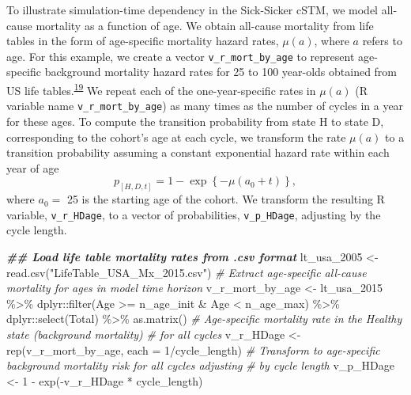 \documentclass[
]{article}
\newenvironment{Shaded}{\begin{snugshade}}{\end{snugshade}}
\newcommand{\AttributeTok}[1]{\textcolor[rgb]{0.77,0.63,0.00}{#1}}
\newcommand{\CommentTok}[1]{\textcolor[rgb]{0.56,0.35,0.01}{\textit{#1}}}
\newcommand{\DecValTok}[1]{\textcolor[rgb]{0.00,0.00,0.81}{#1}}
\newcommand{\DocumentationTok}[1]{\textcolor[rgb]{0.56,0.35,0.01}{\textbf{\textit{#1}}}}
\newcommand{\FunctionTok}[1]{\textcolor[rgb]{0.00,0.00,0.00}{#1}}
\newcommand{\NormalTok}[1]{#1}
\newcommand{\OtherTok}[1]{\textcolor[rgb]{0.56,0.35,0.01}{#1}}
\newcommand{\SpecialCharTok}[1]{\textcolor[rgb]{0.00,0.00,0.00}{#1}}
\newcommand{\StringTok}[1]{\textcolor[rgb]{0.31,0.60,0.02}{#1}}
\begin{document}
To illustrate simulation-time dependency in the Sick-Sicker cSTM, we model all-cause mortality as a function of age. We obtain all-cause mortality from life tables in the form of age-specific mortality hazard rates, \(\mu(a)\), where \(a\) refers to age. For this example, we create a vector \texttt{v\_r\_mort\_by\_age} to represent age-specific background mortality hazard rates for 25 to 100 year-olds obtained from US life tables.\textsuperscript{\protect\hyperlink{ref-Arias2017}{19}} We repeat each of the one-year-specific rates in \(\mu(a)\) (R variable name \texttt{v\_r\_mort\_by\_age}) as many times as the number of cycles in a year for these ages. To compute the transition probability from state H to state D, corresponding to the cohort's age at each cycle, we transform the rate \(\mu(a)\) to a transition probability assuming a constant exponential hazard rate within each year of age
\[
  p_{[H,D,t]} = 1-\exp\left\{{-\mu(a_0 + t)}\right\},
\]
where \(a_0 =\) 25 is the starting age of the cohort. We transform the resulting R variable, \texttt{v\_r\_HDage}, to a vector of probabilities, \texttt{v\_p\_HDage}, adjusting by the cycle length.

\begin{Shaded}
\begin{Highlighting}[]
\DocumentationTok{\#\# Load life table mortality rates from \textasciigrave{}.csv\textasciigrave{} format}
\NormalTok{lt\_usa\_2005 }\OtherTok{\textless{}{-}} \FunctionTok{read.csv}\NormalTok{(}\StringTok{"LifeTable\_USA\_Mx\_2015.csv"}\NormalTok{)}
\CommentTok{\# Extract age{-}specific all{-}cause mortality for ages in model time horizon}
\NormalTok{v\_r\_mort\_by\_age }\OtherTok{\textless{}{-}}\NormalTok{ lt\_usa\_2015 }\SpecialCharTok{\%\textgreater{}\%} 
\NormalTok{  dplyr}\SpecialCharTok{::}\FunctionTok{filter}\NormalTok{(Age }\SpecialCharTok{\textgreater{}=}\NormalTok{ n\_age\_init }\SpecialCharTok{\&}\NormalTok{ Age }\SpecialCharTok{\textless{}}\NormalTok{ n\_age\_max) }\SpecialCharTok{\%\textgreater{}\%}
\NormalTok{  dplyr}\SpecialCharTok{::}\FunctionTok{select}\NormalTok{(Total) }\SpecialCharTok{\%\textgreater{}\%}
  \FunctionTok{as.matrix}\NormalTok{()}
\CommentTok{\# Age{-}specific mortality rate in the Healthy state (background mortality) }
\CommentTok{\# for all cycles}
\NormalTok{v\_r\_HDage  }\OtherTok{\textless{}{-}} \FunctionTok{rep}\NormalTok{(v\_r\_mort\_by\_age, }\AttributeTok{each =} \DecValTok{1}\SpecialCharTok{/}\NormalTok{cycle\_length)}
\CommentTok{\# Transform to age{-}specific background mortality risk for all cycles adjusting }
\CommentTok{\# by cycle length}
\NormalTok{v\_p\_HDage  }\OtherTok{\textless{}{-}} \DecValTok{1} \SpecialCharTok{{-}} \FunctionTok{exp}\NormalTok{(}\SpecialCharTok{{-}}\NormalTok{v\_r\_HDage }\SpecialCharTok{*}\NormalTok{ cycle\_length) }
\end{Highlighting}
\end{Shaded}
\end{document}
